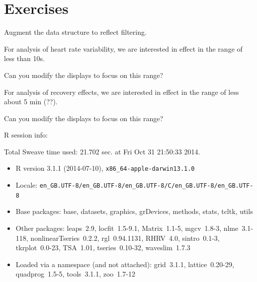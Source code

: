\documentclass[a4paper, english, utf8]{amsart}
\newcommand{\R}{{\normalfont\textsf{R}}{}}
\begin{document}

\section{Exercises}
\begin{exca}
Augment the data structure to reflect filtering.
\end{exca}

\begin{exca}
For analysis of heart rate variability, we are interested in effect in the range of less than 10s.

Can you modify the displays to focus on this range?
\end{exca}

\begin{exca}
For analysis of recovery effects, we are interested in effect in the range of less about 5 min (??).

Can you modify the displays to focus on this range?
\end{exca}

\clearpage
\nocite{*}
%

%
\clearpage

\printindex

%

\clearpage
\R{} session info:

Total Sweave time used: 21.702 sec. at Fri Oct 31 21:50:33 2014.

{\tiny
\begin{itemize}\raggedright
  \item R version 3.1.1 (2014-07-10), \verb|x86_64-apple-darwin13.1.0|
  \item Locale: \verb|en_GB.UTF-8/en_GB.UTF-8/en_GB.UTF-8/C/en_GB.UTF-8/en_GB.UTF-8|
  \item Base packages: base, datasets, graphics, grDevices,
    methods, stats, tcltk, utils
  \item Other packages: leaps~2.9, locfit~1.5-9.1,
    Matrix~1.1-5, mgcv~1.8-3, nlme~3.1-118,
    nonlinearTseries~0.2.2, rgl~0.94.1131, RHRV~4.0,
    sintro~0.1-3, tkrplot~0.0-23, TSA~1.01, tseries~0.10-32,
    waveslim~1.7.3
  \item Loaded via a namespace (and not attached): grid~3.1.1,
    lattice~0.20-29, quadprog~1.5-5, tools~3.1.1, zoo~1.7-12
\end{itemize}}
\end{document}
